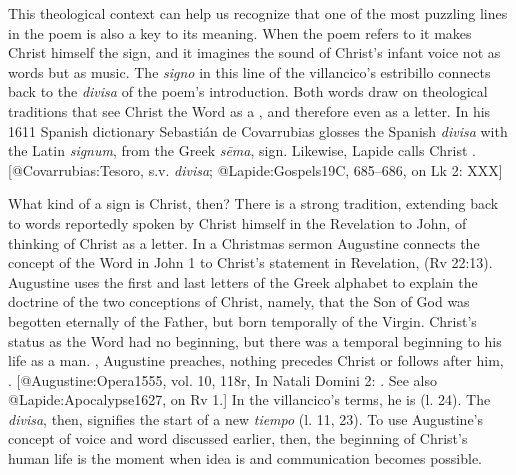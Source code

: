 This theological context can help us recognize that one of the most puzzling
lines in the poem is also a key to its meaning. 
When the poem refers to  it makes Christ himself
the sign, and it imagines the sound of Christ's infant voice not as words but as
music. 
The \emph{signo} in this line of the villancico's estribillo connects back to the
\emph{divisa} of the poem's introduction.
Both words draw on theological traditions that see Christ the Word as a ,
and therefore even as a letter.
In his 1611 Spanish dictionary Sebastián de Covarrubias glosses the Spanish
\emph{divisa} with the Latin \emph{signum}, from the Greek \emph{sēma}, sign. 
Likewise, Lapide calls Christ .
[@Covarrubias:Tesoro, s.v. \emph{divisa}; @Lapide:Gospels19C, 685--686, on Lk 2:
XXX]

What kind of a sign is Christ, then?
There is a strong tradition, extending back to words reportedly spoken by Christ
himself in the Revelation to John, of thinking of Christ as a letter.
In a Christmas sermon Augustine connects the concept of the Word in John 1 to
Christ's statement in Revelation,  (Rv 22:13).
Augustine uses the first and last letters of the Greek alphabet to explain the
doctrine of the two conceptions of Christ, namely, that the Son of God was
begotten eternally of the Father, but born temporally of the Virgin.
Christ's status as the Word had no beginning, but there was a temporal beginning
to his life as a man.
, Augustine preaches, nothing
precedes Christ or follows after him, .
[@Augustine:Opera1555, vol. 10, 118r, In Natali Domini 2:
. See also @Lapide:Apocalypse1627, on
Rv 1.]
In the villancico's terms, he is  (l. 24).
The \emph{divisa}, then, signifies the start of a new \emph{tiempo} (l.  11, 23).
To use Augustine's concept of voice and word discussed earlier, then, the
beginning of Christ's human life is the moment when idea is  and communication becomes possible.

